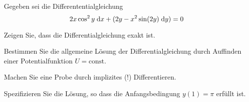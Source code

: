 \begin{atiTask}[
  title = Exakte Differentialgleichung
]
  Gegeben sei die Differententialgleichung
  \begin{equation*}
  2x\cos^2y\;\mathrm{d} x+ (2y-x^2\sin(2y)\;\mathrm{d} y)=0
  \end{equation*}
  \begin{atiSubtasks}
  \item Zeigen Sie, dass die Differentialgleichung exakt ist.
  \item Bestimmen Sie die allgemeine Lösung der Differentialgleichung durch Auffinden einer Potentialfunktion $U=\text{const}$.
  \item Machen Sie eine Probe durch implizites (!) Differentieren.
  \item Spezifizieren Sie die Lösung, so dass die Anfangsbedingung $y(1)=\pi$ erfüllt ist. 
  \end{atiSubtasks}
\end{atiTask}